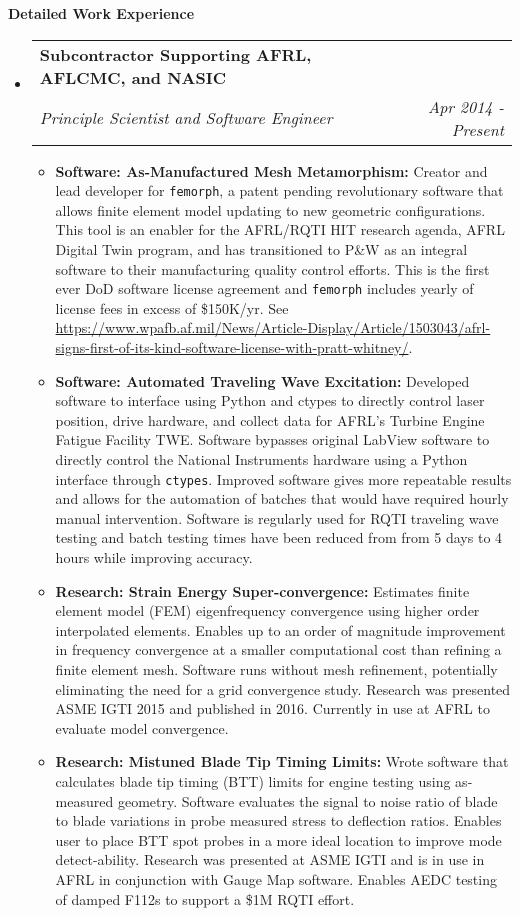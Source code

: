 \documentclass[letterpaper,11pt]{article}
\makeatletter
\newcommand{\resitem}[1]{\item #1 \vspace{-2pt}}
\newcommand{\resheading}[1]{{\large \colorbox{mygrey}{\begin{minipage}{\textwidth}{\textbf{#1 \vphantom{p\^{E}}}}\end{minipage}}}}
\newcommand{\ressubheading}[4]{
\begin{tabular*}{7.0in}{l@{\extracolsep{\fill}}r}
		\textbf{#1} & #2 \\
		\textit{#3} & \textit{#4} \\
\end{tabular*}\vspace{-6pt}}
\makeatother
\begin{document}
\resheading{Detailed Work Experience}
\begin{itemize}

\item
  \ressubheading{Subcontractor Supporting AFRL, AFLCMC, and NASIC}{}{Principle Scientist and Software Engineer}{Apr 2014 - Present}
  \begin{itemize}
    \resitem{\textbf{Software: As-Manufactured Mesh Metamorphism:} Creator and lead developer for \texttt{femorph}, a patent pending revolutionary software that allows finite element model updating to new geometric configurations. This tool is an enabler for the AFRL/RQTI HIT research agenda, AFRL Digital Twin program, and has transitioned to P\&W as an integral software to their manufacturing quality control efforts. This is the first ever DoD software license agreement and \texttt{femorph} includes yearly of license fees in excess of \$150K/yr. See \url{https://www.wpafb.af.mil/News/Article-Display/Article/1503043/afrl-signs-first-of-its-kind-software-license-with-pratt-whitney/}.}
    \resitem{\textbf{Software: Automated Traveling Wave Excitation:} Developed software to interface using Python and ctypes to directly control laser position, drive hardware, and collect data for AFRL's Turbine Engine Fatigue Facility TWE. Software bypasses original LabView software to directly control the National Instruments hardware using a Python interface through \texttt{ctypes}. Improved software gives more repeatable results and allows for the automation of batches that would have required hourly manual intervention. Software is regularly used for RQTI traveling wave testing and batch testing times have been reduced from from 5 days to 4 hours while improving accuracy.}
    \resitem{\textbf{Research: Strain Energy Super-convergence:}  Estimates finite element model (FEM) eigenfrequency convergence using higher order interpolated elements. Enables up to an order of magnitude improvement in frequency convergence at a smaller computational cost than refining a finite element mesh. Software runs without mesh refinement, potentially eliminating the need for a grid convergence study. Research was presented ASME IGTI 2015 and published in 2016. Currently in use at AFRL to evaluate model convergence.}
    \resitem{\textbf{Research: Mistuned Blade Tip Timing Limits:}  Wrote software that calculates blade tip timing (BTT) limits for engine testing using as-measured geometry. Software evaluates the signal to noise ratio of blade to blade variations in probe measured stress to deflection ratios. Enables user to place BTT spot probes in a more ideal location to improve mode detect-ability. Research was presented at ASME IGTI and is in use in AFRL in conjunction with Gauge Map software. Enables AEDC testing of damped F112s to support a \$1M RQTI effort.}

\end{itemize}
\end{itemize}
\end{document}
